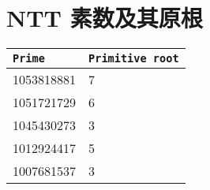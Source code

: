 \section{NTT 素数及其原根}
\begin{tabular}{|l|l|}
\hline
\texttt{Prime} & \texttt{Primitive root} \\
\hline
1053818881 & 7 \\
\hline
1051721729 & 6 \\
\hline
1045430273 & 3 \\
\hline
1012924417 & 5 \\
\hline
1007681537 & 3 \\
\hline
\end{tabular}
